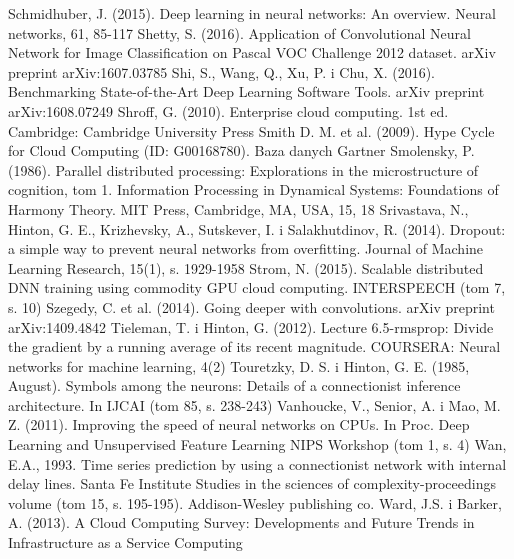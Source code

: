 \documentclass[12pt,a4paper,twoside]{article}
\begin{document}
\begin{thebibliography}{99}
 Schmidhuber, J. (2015). Deep learning in neural networks: An overview. Neural networks, 61, 85-117
 Shetty, S. (2016).  Application of Convolutional Neural Network for Image Classification on Pascal VOC Challenge 2012 dataset. arXiv preprint arXiv:1607.03785
 Shi, S., Wang, Q., Xu, P. i Chu, X. (2016). Benchmarking State-of-the-Art Deep Learning Software Tools. arXiv preprint arXiv:1608.07249
 Shroff, G. (2010). Enterprise cloud computing. 1st ed. Cambridge: Cambridge University Press
 Smith D. M. et al. (2009). Hype Cycle for Cloud Computing (ID: G00168780). Baza danych Gartner
 Smolensky, P. (1986). Parallel distributed processing: Explorations in the microstructure of cognition, tom 1. Information Processing in Dynamical Systems: Foundations of Harmony Theory. MIT Press, Cambridge, MA, USA, 15, 18
 Srivastava, N., Hinton, G. E., Krizhevsky, A., Sutskever, I. i Salakhutdinov, R. (2014). Dropout: a simple way to prevent neural networks from overfitting. Journal of Machine Learning Research, 15(1), s. 1929-1958
 Strom, N. (2015). Scalable distributed DNN training using commodity GPU cloud computing. INTERSPEECH (tom 7, s. 10)
 Szegedy, C. et al. (2014). Going deeper with convolutions. arXiv preprint arXiv:1409.4842
 Tieleman, T. i Hinton, G. (2012). Lecture 6.5-rmsprop: Divide the gradient by a running average of its recent magnitude. COURSERA: Neural networks for machine learning, 4(2)
 Touretzky, D. S. i Hinton, G. E. (1985, August). Symbols among the neurons: Details of a connectionist inference architecture. In IJCAI (tom 85, s. 238-243)
 Vanhoucke, V., Senior, A. i Mao, M. Z. (2011). Improving the speed of neural networks on CPUs. In Proc. Deep Learning and Unsupervised Feature Learning NIPS Workshop (tom 1, s. 4)
 Wan, E.A., 1993. Time series prediction by using a connectionist network with internal delay lines. Santa Fe Institute Studies in the sciences of complexity-proceedings volume (tom 15, s. 195-195). Addison-Wesley publishing co.
 Ward, J.S. i Barker, A. (2013). A Cloud Computing Survey: Developments and Future Trends in Infrastructure as a Service Computing

\end{thebibliography}
\end{document}
